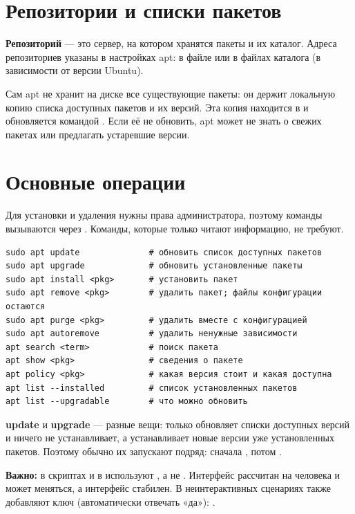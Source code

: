 \section{Репозитории и списки пакетов}

\textbf{Репозиторий} --- это сервер, на котором хранятся пакеты и их
каталог. Адреса репозиториев указаны в настройках apt:
в файле  или в файлах каталога
 (в зависимости от версии Ubuntu).

Сам apt не хранит на диске все существующие пакеты: он держит локальную копию списка доступных пакетов и их версий. Эта копия находится в
 и обновляется командой .
Если её не обновить, apt может не знать о свежих пакетах или
предлагать устаревшие версии.

\section{Основные операции}

Для установки и удаления нужны права администратора, поэтому команды вызываются через . Команды, которые только читают
информацию,  не требуют.

\begin{verbatim}
sudo apt update              # обновить список доступных пакетов
sudo apt upgrade             # обновить установленные пакеты
sudo apt install <pkg>       # установить пакет
sudo apt remove <pkg>        # удалить пакет; файлы конфигурации остаются
sudo apt purge <pkg>         # удалить вместе с конфигурацией
sudo apt autoremove          # удалить ненужные зависимости
apt search <term>            # поиск пакета
apt show <pkg>               # сведения о пакете
apt policy <pkg>             # какая версия стоит и какая доступна
apt list --installed         # список установленных пакетов
apt list --upgradable        # что можно обновить
\end{verbatim}

\textbf{update} и \textbf{upgrade} --- разные вещи:
 только обновляет списки доступных версий и ничего не
устанавливает, а  устанавливает новые версии уже
установленных пакетов. Поэтому обычно их запускают подряд:
сначала , потом .

\textbf{Важно:} в скриптах и в  используют
, а не . Интерфейс  рассчитан на
человека и может меняться, а интерфейс  стабилен. В
неинтерактивных сценариях также добавляют ключ 
(автоматически отвечать «да»):
.

